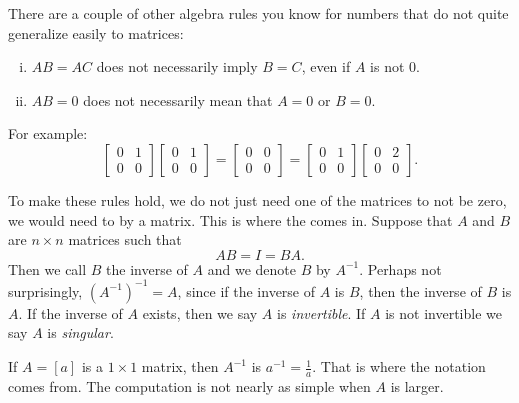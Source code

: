 There are a couple of other algebra rules you know for numbers that do not quite
generalize easily to matrices:
\begin{enumerate}[(i)]
\item $AB = AC$ does not necessarily imply $B=C$, even if $A$ is not 0.
\item $AB = 0$ does not necessarily mean that $A=0$ or $B=0$.
\end{enumerate}
For example:
\begin{equation*}
\begin{bmatrix} 0 & 1 \\ 0 & 0 \end{bmatrix}
\begin{bmatrix} 0 & 1 \\ 0 & 0 \end{bmatrix}
=
\begin{bmatrix} 0 & 0 \\ 0 & 0 \end{bmatrix}
=
\begin{bmatrix} 0 & 1 \\ 0 & 0 \end{bmatrix}
\begin{bmatrix} 0 & 2 \\ 0 & 0 \end{bmatrix} .
\end{equation*}

To make these rules hold, we do not just need one of the matrices to not be zero,
we would need to  by
a matrix.  This is where the \emph{} comes in.
Suppose that $A$ and $B$ are $n \times n$ matrices such that
\begin{equation*}
AB = I = BA .
\end{equation*}
Then we call $B$ the inverse of $A$ and we denote $B$ by $A^{-1}$.
Perhaps not surprisingly, ${(A^{-1})}^{-1} = A$, since if the inverse of $A$ 
is $B$, then the inverse of $B$ is $A$.
If the inverse of $A$ exists, then we say $A$ is
\emph{invertible}.
If $A$ is not invertible we say $A$ is
\emph{singular}.

If $A = [a]$ is a $1 \times 1$ matrix, then $A^{-1}$ is $a^{-1} =
\frac{1}{a}$.  That is where the notation comes from.  The computation is not nearly as simple when $A$ is
larger.


